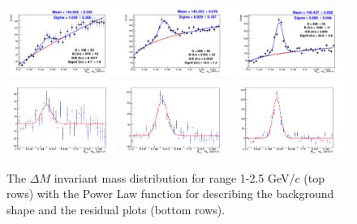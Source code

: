 \begin{figure}[tb]
\begin{center}
\includegraphics[width=1\textwidth]{figures/Dstar/pp13TeV/multi_trial/Figure_01.png}
\includegraphics[width=0.32\textwidth]{figures/Dstar/pp13TeV/multi_trial/residual_plot_Pow_bkg_func_1-1dot5GeV.png} 
\includegraphics[width=0.32\textwidth]{figures/Dstar/pp13TeV/multi_trial/residual_plot_Pow_bkg_func_1dot5-2GeV.png}
\includegraphics[width=0.32\textwidth]{figures/Dstar/pp13TeV/multi_trial/residual_plot_Pow_bkg_func_2-2dot5GeV.png} 
\caption{The \Dstar $\Delta M$ invariant mass distribution for \pt range 1-2.5 GeV/$c$ (top rows) with the Power Law function for describing the background shape and the residual plots (bottom rows).}
\label{fig:Dstar_compar2}
\end{center}
\end{figure}



